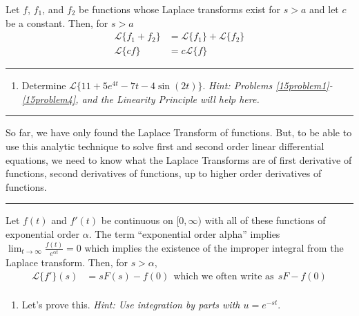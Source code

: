 \newpage
{}

Let $f$, $f_1$, and $f_2$ be functions whose Laplace transforms exist for $s>a$ and let $c$ be a constant. Then, for $s>a$
\begin{align*}
\mathscr{L}\{f_1+f_2\} &= \mathscr{L}\{f_1\}+\mathscr{L}\{f_2\} \\
\mathscr{L}\{cf\} &= c\mathscr{L}\{f\}
\end{align*}
\hrule
\vspace{6pt}
\begin{enumerate}[resume]
\item Determine $\mathscr{L}\{11+5e^{4t}-7t-4\sin(2t)\}$. \textsl{Hint: Problems \ref{15problem1}-\ref{15problem4}, and the Linearity Principle will help here.} \label{15problem5}
\vfill
\end{enumerate}

\hrule
{}

So far, we have only found the Laplace Transform of functions. But, to be able to use this analytic technique to solve first and second order linear differential equations, we need to know what the Laplace Transforms are of first derivative of functions, second derivatives of functions, up to higher order derivatives of functions. \\

\hrule
\vspace{6pt}
Let $f(t)$ and $f'(t)$ be continuous on $[0,\infty)$ with all of these functions of exponential order $\alpha$. The term ``exponential order alpha'' implies $\displaystyle \lim_{t\rightarrow\infty} \frac{f(t)}{e^{\alpha t}}=0$ which implies the existence of the improper integral from the Laplace transform. Then, for $s>\alpha$, 
\begin{align*}
\mathscr{L}\{f'\}(s) &=sF(s)-f(0) ~~ \textrm{which we often write as} ~~ sF-f(0) \\
\end{align*}
\begin{enumerate}[resume]
\item Let's prove this. \textsl{Hint: Use integration by parts with $u=e^{-st}$}. \label{15problem6}
\end{enumerate}
\vfill

